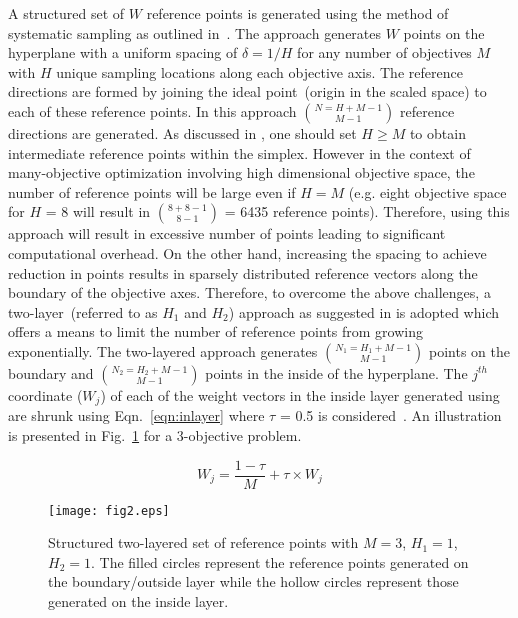 A structured set of $W$ reference points is generated using the method of systematic sampling as outlined in~\cite{das1998normal}. The approach generates $W$ points on the hyperplane with a uniform spacing of $\delta=1/H$ for any number of objectives $M$ with $H$ unique sampling locations along each objective axis. The reference directions are formed by joining the ideal point~(origin in the scaled space) to each of these reference points. In this approach $N = {H+M-1}\choose{M-1}$ reference directions are generated. As discussed in \cite{Deb2014box}, one should set $H \ge M$ to obtain intermediate reference points within the simplex. However in the context of many-objective optimization involving high dimensional objective space, the number of reference points will be large even if $H = M$ (e.g. eight objective space for $H$ = 8 will result in ${8+8-1}\choose{8-1}$ = 6435 reference points). Therefore, using this approach will result in excessive number of points leading to significant computational overhead. On the other hand, increasing the spacing to achieve reduction in points results in sparsely distributed reference vectors along the boundary of the objective axes. Therefore, to overcome the above challenges, a two-layer~(referred to as $H_1$ and $H_2$) approach as suggested in \cite{Li2015dominance} is adopted which offers a means to limit the number of reference points from growing exponentially. The two-layered approach generates $N_1 = {H_1+M-1}\choose{M-1}$ points on the boundary and $N_2 = {H_2+M-1}\choose{M-1}$ points in the inside of the hyperplane. The $j^{th}$ coordinate ($W_j$) of each of the weight vectors in the inside layer generated using \cite{das1998normal} are shrunk using Eqn.~\ref{eqn:inlayer} where $\tau$ = 0.5 is considered~\cite{Li2015dominance}. An illustration is presented in Fig.~\ref{fig:Refpoint} for a 3-objective problem.

\begin{equation}
W_j = \frac{1-\tau}{M} + \tau \times W_j
\label{eqn:inlayer} 
\end{equation}   

\begin{figure}[!htb]
	\centering
	\texttt{[image: fig2.eps]}
	\caption{Structured two-layered set of reference points with $M=3$, $H_1=1$, $H_2=1$. The filled circles represent the reference points generated on the boundary/outside layer while the hollow circles represent those generated on the inside layer.}
	\label{fig:Refpoint}
\end{figure}

